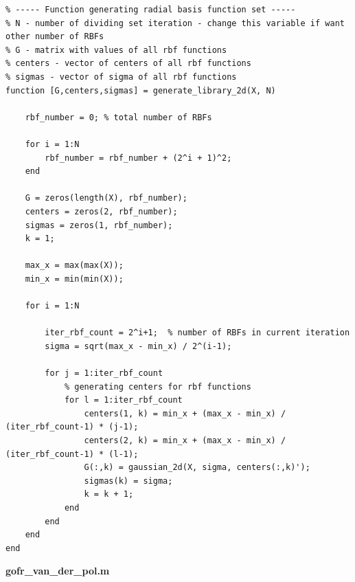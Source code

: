 \begin{lstlisting}
% ----- Function generating radial basis function set -----
% N - number of dividing set iteration - change this variable if want other number of RBFs
% G - matrix with values of all rbf functions
% centers - vector of centers of all rbf functions
% sigmas - vector of sigma of all rbf functions
function [G,centers,sigmas] = generate_library_2d(X, N)

    rbf_number = 0; % total number of RBFs

    for i = 1:N
        rbf_number = rbf_number + (2^i + 1)^2;
    end

    G = zeros(length(X), rbf_number);
    centers = zeros(2, rbf_number);
    sigmas = zeros(1, rbf_number);
    k = 1;

    max_x = max(max(X));
    min_x = min(min(X));

    for i = 1:N

        iter_rbf_count = 2^i+1;  % number of RBFs in current iteration
        sigma = sqrt(max_x - min_x) / 2^(i-1);

        for j = 1:iter_rbf_count
            % generating centers for rbf functions
            for l = 1:iter_rbf_count
                centers(1, k) = min_x + (max_x - min_x) / (iter_rbf_count-1) * (j-1);
                centers(2, k) = min_x + (max_x - min_x) / (iter_rbf_count-1) * (l-1);
                G(:,k) = gaussian_2d(X, sigma, centers(:,k)'); 
                sigmas(k) = sigma;
                k = k + 1;
            end
        end    
    end
end
\end{lstlisting}

\textbf{gofr\_van\_der\_pol.m}

